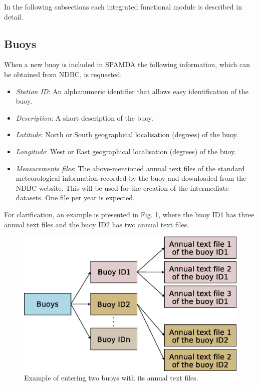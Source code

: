 \documentclass[energies,article,submit,moreauthors,pdftex]{Definitions/mdpi}
\begin{document}
		In the following subsections each integrated functional module is described in detail.

			\subsection{Buoys}\label{sec:Buoys}
			
				When a new buoy is included in SPAMDA the following information, which can be obtained from NDBC, is requested:
				\begin{itemize}
					\item \textit{Station ID}: An alphanumeric identifier that allows easy identification of the buoy.
					\item \textit{Description}: A short description of the buoy.
					\item \textit{Latitude}: North or South geographical localisation (degrees) of the buoy.
					\item \textit{Longitude}: West or East geographical localisation (degrees) of the buoy.
					\item \textit{Measurements files}: The above-mentioned annual text files of the standard meteorological information recorded by the buoy and downloaded from the NDBC website. This will be used for the creation of the intermediate datasets. One file per year is expected.
				\end{itemize}
				
				For clarification, an example is presented in Fig. \ref{fig:buoys}, where the buoy ID1 has three annual text files and the buoy ID2 has two annual text files.
				
				\begin{figure}[ht!]
					\centering
					\includegraphics[scale=0.4]{figures/FigureBuoys.eps}
					\caption{Example of entering two buoys with its annual text files.}
					\label{fig:buoys}
				\end{figure}
\end{document}
